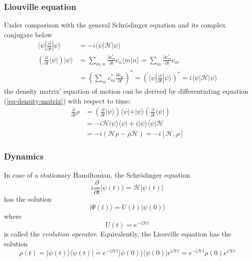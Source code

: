 \documentclass[11.5pt,a4paper]{article}
\begin{document}
\subsubsection{Liouville equation}
Under comparison with the general Schr\"odinger equation and its complex conjugate below
\begin{align}
 \langle \psi | \frac{\partial}{\partial t} |\psi\rangle  & = -i \langle \psi | \mathcal{H} |\psi\rangle \\
  \left( \frac{\partial}{\partial t} \langle \psi | \right)  |\psi\rangle
   & = \sum_{m,n} \frac{\partial c_m^*}{\partial t} c_n \langle m | n \rangle 
   =  \sum_{m} \frac{\partial c_m^*}{\partial t} c_m \\
   & = \left( \sum_{m} c_m^* \frac{\partial c_m}{\partial t}\right)^*
   = \left( \langle \psi | \frac{\partial}{\partial t} |\psi\rangle \right)^* = i \langle \psi |\mathcal{H} |\psi\rangle
\end{align}
the density matrix' equation of motion can be derived by differentiating equation (\ref{eq-density-matrix}) with respect to time:
\begin{align}
 \frac{\partial}{\partial t} \rho & = \left( \frac{\partial}{\partial t} | \psi \rangle \right) \langle \psi | + | \psi \rangle \left( \frac{\partial}{\partial t} \langle \psi | \right)  \\
  & = - i \mathcal{H} |\psi\rangle\langle\psi| + i |\psi\rangle\langle\psi| \mathcal{H}  \\
  & = -i ( \mathcal{H} \rho - \rho \mathcal{H} ) = -i [ \mathcal{H}, \rho ] 
  \label{eq-liouville}
\end{align}

\subsubsection{Dynamics}
\label{sec-dynamics}
In case of a stationary Hamiltonian, the Schr\"odinger equation 
\begin{equation}
  i \frac{\partial}{\partial t} | \psi(t) \rangle = \mathcal{H} |\psi(t) \rangle
\end{equation}
has the solution
\begin{equation}
  |\Psi(t)\rangle = U(t) | \psi(0) \rangle
\end{equation}
where 
\begin{equation}
 U(t) = e^{-i \mathcal{H} t}
  \label{eq-evolution}
\end{equation}
is called the \emph{evolution operator}.
Equivalently, the Liouville equation has the solution
\begin{equation}
 \rho(t) = |\psi(t)\rangle \langle \psi(t)| = e^{-i \mathcal{H} t} | \psi(0) \rangle \langle \psi(0) | e^{i \mathcal{H} t} = e^{-i \mathcal{H} t} \rho(0) e^{i \mathcal{H} t}
\end{equation}
\end{document}
